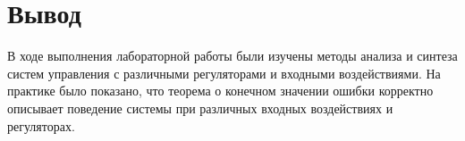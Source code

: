 
\FloatBarrier

\FloatBarrier

\FloatBarrier

\FloatBarrier

\FloatBarrier

\FloatBarrier
\section{Вывод}
В ходе выполнения лабораторной работы были изучены методы анализа и синтеза
систем управления с различными регуляторами и входными воздействиями. 
На практике было показано, что теорема о конечном значении ошибки корректно 
описывает поведение системы при различных входных воздействиях и регуляторах. 